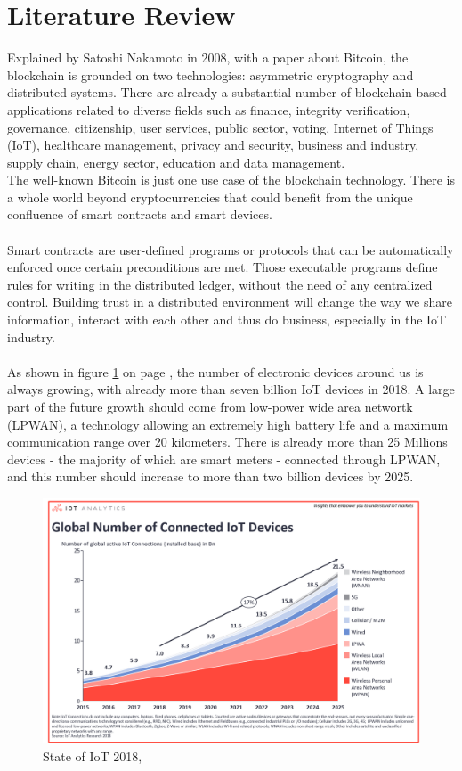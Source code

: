 \documentclass[11pt]{article}
\begin{document}
\section{Literature Review}
Explained by Satoshi Nakamoto in 2008, with a paper about Bitcoin, the blockchain is grounded on two technologies: asymmetric cryptography and distributed systems. There are already a substantial number of blockchain-based applications related to diverse fields such as finance, integrity verification, governance, citizenship, user services, public sector, voting, Internet of Things (IoT), healthcare management, privacy and security, business and industry, supply chain, energy sector, education and data management.\cite{1} \\
The well-known Bitcoin is just one use case of the blockchain technology. There is a whole world beyond cryptocurrencies that could benefit from the unique confluence of smart contracts and smart devices.\\\\
Smart contracts are user-defined programs or protocols that can be automatically enforced once certain preconditions are met. Those executable programs define rules for writing in the distributed ledger, without the need of any centralized control. Building trust in a distributed environment will change the way we share information, interact with each other and thus do business, especially in the IoT industry.\cite{2}\\\\
As shown in figure \ref{img_state} on page \pageref{img_state}, the number of electronic devices around us is always growing, with already more than seven billion IoT devices in 2018. A large part of the future growth should come from low-power wide area networtk (LPWAN), a technology allowing an extremely high battery life and a maximum communication range over 20 kilometers. There is already more than 25 Millions devices - the majority of which are smart meters - connected through LPWAN, and this number should increase to more than two billion devices by 2025.\\

\begin{figure}
	\begin{center}
		\includegraphics[scale=0.275]{stateofIoT2018.png}
		\caption{State of IoT 2018, \cite{3}}
		\label{img_state}
	\end{center}
\end{figure}
\end{document}
